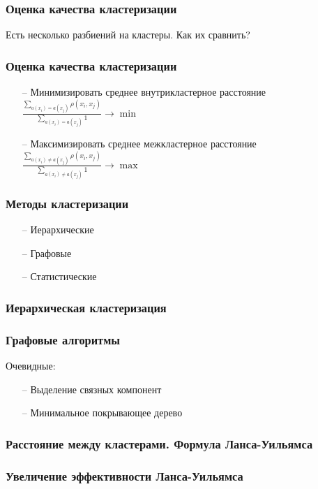 \documentclass[12pt]{beamer}
\begin{document}
\begin{frame}\frametitle{Оценка качества кластеризации}
Есть несколько разбиений на кластеры. Как их сравнить?
\end{frame}

\begin{frame}\frametitle{Оценка качества кластеризации}
\begin{itemize}
\item[--] Минимизировать среднее внутрикластерное расстояние\\
\vspace{5mm}
${\frac{\sum_{a(x_i) = a(x_j)} \rho(x_i, x_j)}{\sum_{a(x_i) = a(x_j)} 1} \rightarrow \min}$
\item[--] Максимизировать среднее межкластерное расстояние\\
\vspace{5mm}
${\frac{\sum_{a(x_i) \neq a(x_j)} \rho(x_i, x_j)}{\sum_{a(x_i) \neq a(x_j)} 1} \rightarrow \max}$
\end{itemize}
\end{frame}

\begin{frame}\frametitle{Методы кластеризации}
\begin{itemize}
\item[--] Иерархические
\item[--] Графовые 
\item[--] Статистические 
\end{itemize}
\end{frame}

\begin{frame}\frametitle{Иерархическая кластеризация}

\end{frame}

\begin{frame}\frametitle{Графовые алгоритмы}
Очевидные:\\
\begin{itemize}
\item[--] Выделение связных компонент
\item[--] Минимальное покрывающее дерево
\end{itemize}
\end{frame}

\begin{frame}\frametitle{Расстояние между кластерами. Формула Ланса-Уильямса}
\end{frame}

\begin{frame}\frametitle{Увеличение эффективности Ланса-Уильямса}
\end{frame}
\end{document}

